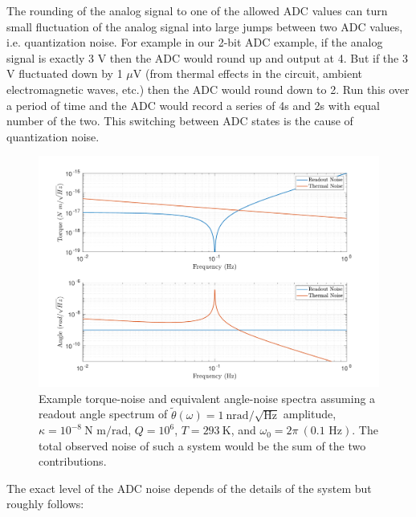 \documentclass{book}
\begin{document}
The rounding of the analog signal to one of the allowed ADC values can turn small fluctuation of the analog signal into large jumps between two ADC values, i.e. quantization noise. For example in our 2-bit ADC example, if the analog signal is exactly 3 V then the ADC would round up and output at 4. But if the 3 V fluctuated down by 1 $\mu$V (from thermal effects in the circuit, ambient electromagnetic waves, etc.) then the ADC would round down to 2. Run this over a period of time and the ADC would record a series of 4s and 2s with equal number of the two. This switching between ADC states is the cause of quantization noise. 

\begin{figure}[!h]
\begin{centering}
\includegraphics[width=\textwidth]{NoiseSpectrum.pdf}
\caption{Example torque-noise and equivalent angle-noise spectra assuming a readout angle spectrum of $\tilde{\theta}(\omega) = 1\ \text{nrad}/\sqrt{\text{Hz}}$ amplitude, $\kappa=10^{-8}\ \text{N m/rad}$, $Q=10^6$, $T=293\ \text{K}$, and $\omega_0=2\pi\ (0.1 \text{ Hz})$. The total observed noise of such a system would be the sum of the two contributions.}\label{noiseSpec}
\end{centering}
\end{figure}

The exact level of the ADC noise depends of the details of the system but roughly follows:
\end{document}
